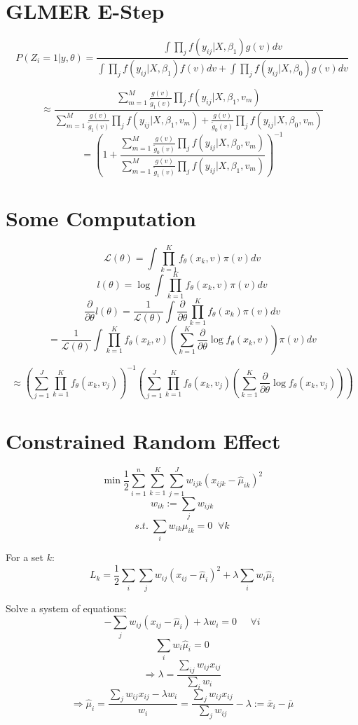 \documentclass{article}
\begin{document}
\section{GLMER E-Step}
$$
P(Z_i= 1 | y, \theta) = 
\frac{\int \prod_{j} f(y_{ij}|X,\beta_1) g(v)dv}
{\int \prod_{j} f(y_{ij}|X,\beta_1) f(v)dv + \int \prod_{j} f(y_{ij}|X,\beta_0) g(v)dv}
$$

$$
\approx \frac{\sum_{m=1}^{M} \frac{g(v)}{\tilde{g}_1(v)}\prod_{j} f(y_{ij}|X,\beta_1,v_{m})}
{\sum_{m=1}^{M} \frac{g(v)}{\tilde{g}_1(v)}\prod_{j} f(y_{ij}|X,\beta_1,v_{m}) + 
\frac{g(v)}{\tilde{g}_0(v)}\prod_{j} f(y_{ij}|X,\beta_0,v_{m})}
$$$$
= \left(
1 + \frac{\sum_{m=1}^{M} \frac{g(v)}{\tilde{g}_0(v)} \prod_{j} f(y_{ij}|X,\beta_0,v_{m})}
{\sum_{m=1}^{M}\frac{g(v)}{\tilde{g}_1(v)}\prod_{j} f(y_{ij}|X,\beta_1,v_{m})}
\right)^{-1}
$$





\break
\section{Some Computation}

$$
\mathcal{L(\theta)} = \int \prod_{k=1}^{K} f_\theta(x_k, v) \pi(v)dv
$$$$
l(\theta) = \log\int \prod_{k=1}^{K} f_\theta(x_k, v) \pi(v)dv
$$$$
\frac{\partial}{\partial \theta} l(\theta) = \frac{1}{\mathcal{L(\theta)}}
\int \frac{\partial}{\partial \theta} \prod_{k=1}^{K} f_\theta(x_k) \pi(v)dv
$$$$
 = \frac{1}{\mathcal{L(\theta)}}
\int \prod_{k=1}^{K} f_\theta(x_k, v)
\left( \sum_{k=1}^{K} \frac{\partial}{\partial\theta} \log f_\theta(x_k, v) \right)
\pi(v)dv
$$

$$
\approx \left(\sum_{j=1}^{J}  \prod_{k=1}^{K} f_\theta(x_k, v_j)\right)^{-1}
\left(\sum_{j=1}^{J} \prod_{k=1}^{K} f_\theta(x_k, v_j)
\left( \sum_{k=1}^{K} \frac{\partial}{\partial\theta} \log f_\theta(x_k, v_j) \right)\right)
$$


\break
\section{Constrained Random Effect}
$$
\min\frac{1}{2}\sum_{i=1}^{n} \sum_{k=1}^{K} \sum_{j=1}^{J} w_{ijk}(x_{ijk} - \hat{\mu}_{ik})^{2}
$$$$
w_{ik} := \sum_{j} w_{ijk}
$$$$
s.t. \; \sum_{i}w_{ik} \mu_{ik} = 0 \;\; \forall k
$$

For a set $k$:
$$
L_k = \frac{1}{2}\sum_i\sum_j w_{ij} (x_{ij} - \hat{\mu}_{i})^{2} + \lambda\sum_{i} w_{i} \hat\mu_{i}
$$

Solve a system of equations:
$$
-\sum_{j} w_{ij} (x_{ij} - \hat{\mu}_i) + \lambda w_i  = 0 \;\;\;\;\; \forall i 
$$$$
\sum_i w_i \hat\mu_i = 0
$$$$
\Rightarrow \lambda = \frac{\sum_{ij} w_{ij} x_{ij}}{\sum_{i} w_i }
$$$$
\Rightarrow \hat\mu_i 
= \frac{\sum_{j} w_{ij} x_{ij} - \lambda w_i}{w_i}
= \frac{\sum_{j} w_{ij} x_{ij}}{\sum_{j} w_{ij}} - \lambda := \bar{x}_i - \bar{\mu}
$$
\end{document}
